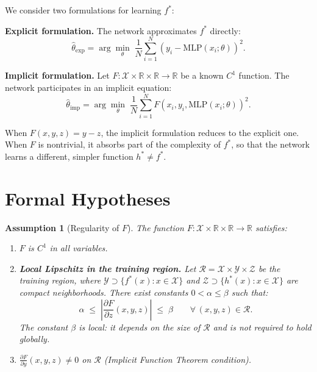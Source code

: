 \documentclass[12pt]{article}
\newtheorem{assumption}{Assumption}
\newcommand{\R}{\mathbb{R}}
\newcommand{\MLP}{\mathrm{MLP}}
\newcommand{\abs}[1]{\left|#1\right|}
\begin{document}
We consider two formulations for learning $f^*$:

\textbf{Explicit formulation.}
The network approximates $f^*$ directly:
\begin{equation}
  \hat{\theta}_{\mathrm{exp}} = \arg\min_\theta \;
  \frac{1}{N}\sum_{i=1}^{N}(y_i - \MLP(x_i;\theta))^2.
  \label{eq:loss_exp}
\end{equation}

\textbf{Implicit formulation.}
Let $F: \mathcal{X} \times \R \times \R \to \R$ be a known $C^1$
function.
The network participates in an implicit equation:
\begin{equation}
  \hat{\theta}_{\mathrm{imp}} = \arg\min_\theta \;
  \frac{1}{N}\sum_{i=1}^{N} F(x_i, y_i, \MLP(x_i;\theta))^2.
  \label{eq:loss_imp}
\end{equation}

When $F(x,y,z) = y - z$, the implicit formulation reduces to the
explicit one.
When $F$ is nontrivial, it absorbs part of the complexity of $f^*$,
so that the network learns a different, simpler function
$h^* \ne f^*$.

\section{Formal Hypotheses}
\label{sec:hypotheses}

\begin{assumption}[Regularity of $F$]
\label{hip:F}
The function $F: \mathcal{X} \times \R \times \R \to \R$ satisfies:
\begin{enumerate}[label=(\alph*)]
  \item $F$ is $C^1$ in all variables.
  \item \textbf{Local Lipschitz in the training region.}
    Let $\mathcal{R} = \mathcal{X} \times \mathcal{Y} \times
    \mathcal{Z}$ be the training region, where
    $\mathcal{Y} \supset \{f^*(x) : x \in \mathcal{X}\}$ and
    $\mathcal{Z} \supset \{h^*(x) : x \in \mathcal{X}\}$ are compact
    neighborhoods.
    There exist constants $0 < \alpha \le \beta$ such that:
    \begin{equation}
      \alpha \;\le\; \abs{\frac{\partial F}{\partial z}(x,y,z)}
      \;\le\; \beta \qquad \forall\,(x,y,z) \in \mathcal{R}.
      \label{eq:sandwich}
    \end{equation}
    The constant $\beta$ is \emph{local}: it depends on the size of
    $\mathcal{R}$ and is not required to hold globally.
  \item $\frac{\partial F}{\partial y}(x,y,z) \neq 0$ on
    $\mathcal{R}$ (Implicit Function Theorem condition).
\end{enumerate}
\end{assumption}
\end{document}

